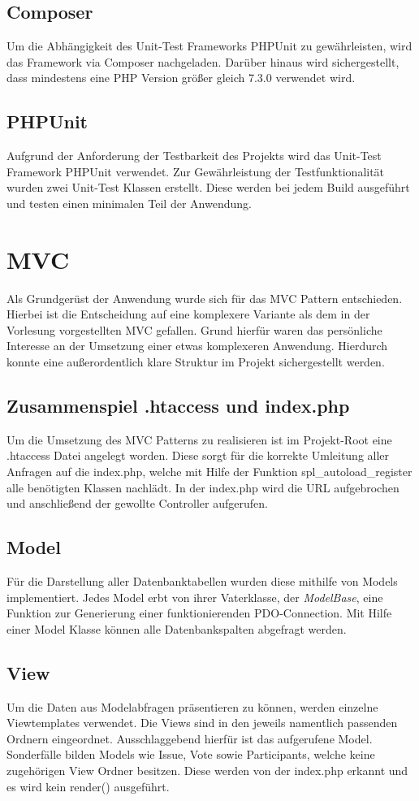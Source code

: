 \subsection{Composer}\label{subsec:composer}
Um die Abhängigkeit des Unit-Test Frameworks PHPUnit zu gewährleisten, wird das Framework via Composer nachgeladen. Darüber hinaus wird sichergestellt, dass mindestens eine PHP Version größer gleich 7.3.0 verwendet wird.
\subsection{PHPUnit}\label{subsec:phpunit}
Aufgrund der Anforderung der Testbarkeit des Projekts wird das Unit-Test Framework PHPUnit verwendet. Zur Gewährleistung der Testfunktionalität wurden zwei Unit-Test Klassen erstellt. Diese werden bei jedem Build ausgeführt und testen einen minimalen Teil der Anwendung.
\section{MVC}\label{sec:mvc}
Als Grundgerüst der Anwendung wurde sich für das MVC Pattern entschieden. Hierbei ist die Entscheidung auf eine komplexere Variante als dem in der Vorlesung vorgestellten MVC gefallen. Grund hierfür waren das persönliche Interesse an der Umsetzung einer etwas komplexeren Anwendung. Hierdurch konnte eine außerordentlich klare Struktur im Projekt sichergestellt werden.
\subsection{Zusammenspiel .htaccess und index.php}\label{subsec:.htaccess}
Um die Umsetzung des MVC Patterns zu realisieren ist im Projekt-Root eine .htaccess Datei angelegt worden. Diese sorgt für die korrekte Umleitung aller Anfragen auf die index.php, welche mit Hilfe der Funktion spl\_{}autoload\_{}register alle benötigten Klassen nachlädt. In der index.php wird die URL aufgebrochen und anschließend der gewollte Controller aufgerufen.
\subsection{Model}\label{subsec:model}
Für die Darstellung aller Datenbanktabellen wurden diese mithilfe von Models implementiert. Jedes Model erbt von ihrer Vaterklasse, der \emph{ModelBase}, eine Funktion zur Generierung einer funktionierenden PDO-Connection. Mit Hilfe einer Model Klasse können alle Datenbankspalten abgefragt werden.
\subsection{View}\label{subsec:view}
Um die Daten aus Modelabfragen präsentieren zu können, werden einzelne Viewtemplates verwendet. Die Views sind in den jeweils namentlich passenden Ordnern eingeordnet. Ausschlaggebend hierfür ist das aufgerufene Model. Sonderfälle bilden Models wie Issue, Vote sowie Participants, welche keine zugehörigen View Ordner besitzen. Diese werden von der index.php erkannt und es wird kein render() ausgeführt. 

